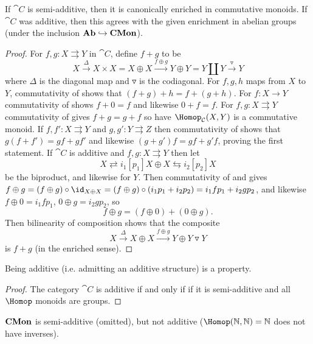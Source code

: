 \documentclass[../main.tex]{subfiles}
\begin{document}
\begin{lem}
	If $\cat C$ is semi-additive, then it is canonically enriched in commutative monoids. If $\cat C$ was additive, then this agrees with the given enrichment in abelian groups (under the inclusion $\mathbf{Ab} \hookrightarrow \mathbf{CMon}$).
\end{lem}
\begin{proof}
	For $f, g: X \rightrightarrows Y$ in $\cat C$, define $f + g$ to be
	\[
		X \xrightarrow{\Delta} X \times X = X \oplus X \xrightarrow{f \oplus g} Y \oplus Y = Y \coprod Y \xrightarrow{\triangledown} Y
	\] where $\Delta$ is the diagonal map and $\triangledown$ is the codiagonal.
	For $f, g, h$ maps from $X$ to $Y$, commutativity of  shows that $(f+g) + h = f + (g + h)$. For $f: X \to Y$ commutativity of  shows $f + 0 = f$ and likewise $ 0 + f = f$.
	 For $f,g: X \rightrightarrows Y$ commutativity of  gives $f + g = g + f$ so have $\Hom_{\cat C}(X,Y)$ is a commutative monoid. If $f,f': X \rightrightarrows Y$ and $g,g':Y  \rightrightarrows Z$ then commutativity of  shows that $g(f+ f') = gf + gf'$ and likewise $(g + g')f = gf + g'f$, proving the first statement.
	If $\cat C$ is additive and $f,g: X \rightrightarrows Y$ then let
	\[
    	X \rightleftarrows{i_1}[p_1] X \oplus X \leftrightarrows{i_2}[p_2] X
    \] be the biproduct, and likewise for $Y$. Then commutativity of  and  gives $f \oplus g = (f \oplus g) \circ \id_{X \oplus X} = (f \oplus g) \circ (i_1 p_1 + i_2 p_2) = i_1 f p_1 + i_2 g p_2$, and likewise $f \oplus 0 = i_1 f p_1$, $0 \oplus g = i_2 g p_2$, so \[
    	f \oplus g = (f \oplus 0) + (0 \oplus g).
    \] Then bilinearity of composition shows that the composite
	\[
    	X \xrightarrow{\Delta} X \oplus X \xrightarrow{f \oplus g} Y \oplus Y \triangledown Y
    \] is $f + g$ (in the enriched sense).
\end{proof}
\begin{cor}
	Being additive (i.e. admitting an additive structure) is a property.
\end{cor}
\begin{proof}
	The category $\cat C$ is additive if and only if if it is semi-additive and all $\Hom$ monoids are groups.
\end{proof}

\begin{exmp}
	$\mathbf{CMon}$ is semi-additive (omitted), but not additive ($\Hom(\bb N, \bb N) = \bb N$ does not have inverses).
\end{exmp}
\end{document}
